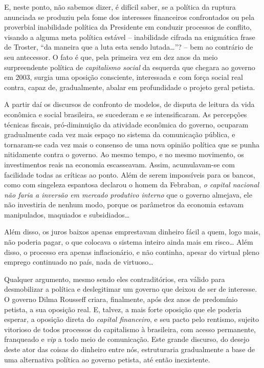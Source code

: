 E, neste ponto, não sabemos dizer, é difícil saber, se a política da
ruptura anunciada se produziu pela fome dos interesses financeiros
confrontados ou pela proverbial inabilidade política da Presidente em
conduzir processos de conflito, visando a alguma meta política estável --
inabilidade cifrada na enigmática frase de Troster, ``da maneira que a
luta esta sendo lutada…''? -- bem ao contrário de seu antecessor. O
fato é que, pela primeira vez em dez anos da meio surpreendente política
de \emph{capitalismo social} da esquerda que chegara ao governo em 2003,
surgia uma oposição consciente, interessada e com força social real
contra, capaz de, gradualmente, abalar em profundidade o projeto geral
petista.

A partir daí os discursos de confronto de modelos, de disputa de leitura
da vida econômica e social brasileira, se sucederam e se intensificaram.
As percepções técnicas fiscais, pró-diminuição da atividade econômica do
governo, ocuparam gradualmente cada vez mais espaço no sistema da
comunicação pública, e tornaram-se cada vez mais o consenso de uma nova
opinião política que se punha nitidamente contra o governo. Ao mesmo
tempo, e no mesmo movimento, os investimentos reais na economia
escasseavam. Assim, acumulavam-se com facilidade todas as críticas ao
ponto. Além de serem impossíveis para os bancos, como com singeleza
espantosa declarou o homem da Febraban, \emph{o capital nacional não
faria a inversão em mercado produtivo interno} que o governo almejava,
ele não investiria de nenhum modo, porque os parâmetros da economia
estavam manipulados, maquiados e subsidiados…

Além disso, os juros baixos apenas emprestavam dinheiro fácil a quem,
logo mais, não poderia pagar, o que colocava o sistema inteiro ainda
mais em risco… Além disso, o processo era apenas inflacionário, e não
continha, apesar do virtual pleno emprego continuado no país, nada de
virtuoso…

Qualquer argumento, mesmo sendo eles contraditórios, era válido para
desmobilizar a política e deslegitimar um governo que deixou de ser de
interesse. O governo Dilma Rousseff criara, finalmente, após dez anos de
predomínio petista, a sua oposição real. E, talvez, a mais forte
oposição que ele poderia esperar, a oposição direta do \emph{capital
financeiro}, e seu pacto pelo rentismo, sujeito vitorioso de todos
processos do capitalismo à brasileira, com acesso permanente, franqueado
e \emph{vip} a todo meio de comunicação. Este grande discurso, do desejo
deste ator das coisas do dinheiro entre nós, estruturaria gradualmente a
base de uma alternativa política ao governo petista, até então
inexistente.


